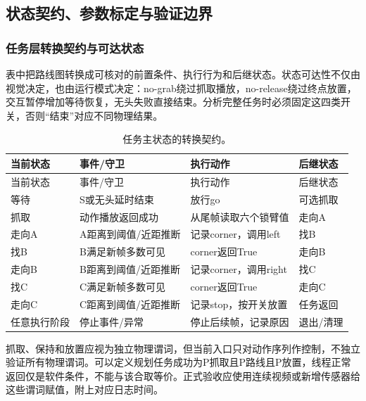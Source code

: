 \subsection{状态契约、参数标定与验证边界}
\subsubsection{任务层转换契约与可达状态}
表中把路线图转换成可核对的前置条件、执行行为和后继状态。状态可达性不仅由视觉决定，也由运行模式决定：no-grab绕过抓取播放，no-release绕过终点放置，交互暂停增加等待恢复，无头失败直接结束。分析完整任务时必须固定这四类开关，否则“结束”对应不同物理结果。
\begin{longtable}{p{25mm}p{38mm}p{42mm}p{27mm}}\caption{任务主状态的转换契约。}\\\toprule 当前状态 & 事件/守卫 & 执行动作 & 后继状态\\\midrule\endfirsthead\toprule 当前状态 & 事件/守卫 & 执行动作 & 后继状态\\\midrule\endhead
等待 & S或无头延时结束 & 放行go & 可选抓取\\
抓取 & 动作播放返回成功 & 从尾帧读取六个锁臂值 & 走向A\\
走向A & A距离到阈值/近距推断 & 记录corner，调用left & 找B\\
找B & B满足新帧多数可见 & corner返回True & 走向B\\
走向B & B距离到阈值/近距推断 & 记录corner，调用right & 找C\\
找C & C满足新帧多数可见 & corner返回True & 走向C\\
走向C & C距离到阈值/近距推断 & 记录stop，按开关放置 & 任务返回\\
任意执行阶段 & 停止事件/异常 & 停止后续帧，记录原因 & 退出/清理\\\bottomrule\end{longtable}
抓取、保持和放置应视为独立物理谓词，但当前入口只对动作序列作控制，不独立验证所有物理谓词。可以定义规划任务成功为P抓取且P路线且P放置，线程正常返回仅是软件条件，不能与该合取等价。正式验收应使用连续视频或新增传感器给这些谓词赋值，附上对应日志时间。

